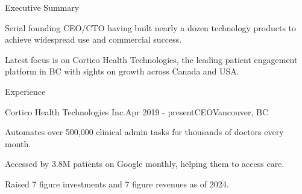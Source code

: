 \documentclass{resume} %
\begin{document}

\begin{rSection}{Executive Summary}
\item Serial founding CEO/CTO having built nearly a dozen technology products to achieve widespread use and commercial success.
\item Latest focus is on Cortico Health Technologies, the leading patient engagement platform in BC with sights on growth across Canada and USA.
\end{rSection}

\begin{rSection}{Experience}



\begin{rSubsection}{Cortico Health Technologies Inc.}{Apr 2019 - present}{CEO}{Vancouver, BC}
\item Automates over 500,000 clinical admin tasks for thousands of doctors every month.
\item Accessed by 3.8M patients on Google monthly, helping them to access care.
\item Raised 7 figure investments and 7 figure revenues as of 2024.
\end{rSubsection}


\end{rSection}
\end{document}
